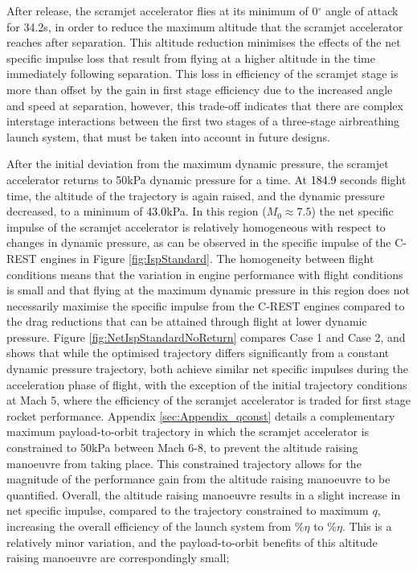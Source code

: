 After release, the scramjet accelerator flies at its minimum of 0$^\circ$ angle of attack for 34.2s, in order to reduce the maximum altitude that the scramjet accelerator reaches after separation. This altitude reduction minimises the effects of the net specific impulse loss that result from flying at a higher altitude in the time immediately following separation. This loss in efficiency of the scramjet stage is more than offset by the gain in first stage efficiency due to the increased angle and speed at separation, however, this trade-off indicates that there are complex interstage interactions between the first two stages of a three-stage airbreathing launch system, that must be taken into account in future designs.
 
After the initial deviation from the maximum dynamic pressure, the scramjet accelerator returns to 50kPa dynamic pressure for a time. 
At \textcolor{black}{184.9} seconds flight time, the altitude of the trajectory is again raised, and the dynamic pressure decreased, to a minimum of \textcolor{black}{43.0}kPa. In this region ($M_0 \approx 7.5$) the net specific impulse of the scramjet accelerator is relatively homogeneous with respect to changes in dynamic pressure, as can be observed in the specific impulse of the C-REST engines in Figure \ref{fig:IspStandard}. The homogeneity between flight conditions means that the variation in engine performance with flight conditions is small and that flying at the maximum dynamic pressure in this region does not necessarily maximise the specific impulse from the C-REST engines compared to the drag reductions that can be attained through flight at lower dynamic pressure. Figure \ref{fig:NetIspStandardNoReturn} compares Case 1 and Case 2, and shows that while the optimised trajectory differs significantly from a constant dynamic pressure trajectory, both achieve similar net specific impulses during the acceleration phase of flight, with the exception of the initial trajectory conditions at Mach 5, where the efficiency of the scramjet accelerator is traded for first stage rocket performance. 
Appendix \ref{sec:Appendix_qconst} details a complementary maximum payload-to-orbit trajectory in which the scramjet accelerator is constrained to 50kPa between Mach 6-8, to prevent the altitude raising manoeuvre from taking place. This constrained trajectory allows for the magnitude of the performance gain from the altitude raising manoeuvre to be quantified. 
Overall, the altitude raising manoeuvre results in a slight increase in net specific impulse, compared to the trajectory constrained to maximum $q$, increasing the overall efficiency of the launch system from \totalExergyEffqconstrainedNoReturn \%$\eta$ to \totalExergyEffStandardNoReturn\%$\eta$. This is a relatively minor variation, and the payload-to-orbit benefits of this altitude raising manoeuvre are correspondingly small; 

